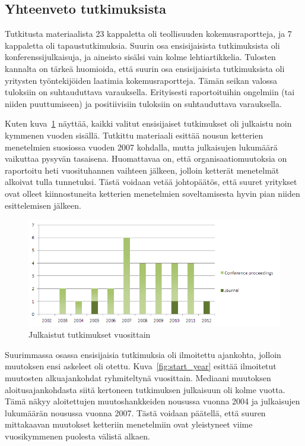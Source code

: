 \subsection{Yhteenveto tutkimuksista}

Tutkitusta materiaalista 23 kappaletta oli teollisuuden kokemusraportteja, ja 7
kappaletta oli tapaustutkimuksia. Suurin osa ensisijaisista tutkimuksista oli
konferenssijulkaisuja, ja aineisto sisälsi vain kolme lehtiartikkelia. Tulosten
kannalta on tärkeä huomioida, että suurin osa ensisijaisista tutkimuksista oli
yritysten työntekijöiden laatimia kokemusraportteja. Tämän seikan valossa
tuloksiin on suhtauduttava varauksella. Erityisesti raportoituihin ongelmiin
(tai niiden puuttumiseen) ja positiivisiin tuloksiin on suhtauduttava
varauksella.

Kuten kuva~\ref{fig:publications} näyttää, kaikki valitut ensisijaiset
tutkimukset oli julkaistu noin kymmenen vuoden sisällä. Tutkittu materiaali
esittää nousun ketterien menetelmien suosiossa vuoden 2007 kohdalla, mutta
julkaisujen lukumäärä vaikuttaa pysyvän tasaisena. Huomattavaa on, että
organisaatiomuutoksia on raportoitu heti vuosituhannen vaihteen jälkeen, jolloin
ketterät menetelmät alkoivat tulla tunnetuksi. Tästä voidaan vetää johtopäätös,
että suuret yritykset ovat olleet kiinnostuneita ketterien menetelmien
soveltamisesta hyvin pian niiden esittelemisen jälkeen.

\begin{figure}[htb]
  \begin{center}
    \includegraphics[width=1\textwidth]{img/Publications}
    \caption{Julkaistut tutkimukset vuosittain}
    \label{fig:publications}
  \end{center}
\end{figure}

Suurimmassa osassa ensisijaisia tutkimuksia oli ilmoitettu ajankohta, jolloin
muutoksen ensi askeleet oli otettu. Kuva~\ref{fig:start_year} esittää ilmoitetut
muutosten alkuajankohdat ryhmiteltynä vuosittain. Mediaani muutoksen
aloitusajankohdasta siitä kertoneen tutkimuksen julkaisuun oli kolme vuotta.
Tämä näkyy aloitettujen muutoshankkeiden nousussa vuonna 2004 ja julkaisujen
lukumäärän nousussa vuonna 2007. Tästä voidaan päätellä, että suuren mittakaavan
muutokset ketteriin menetelmiin ovat yleistyneet viime vuosikymmenen puolesta
välistä alkaen.

